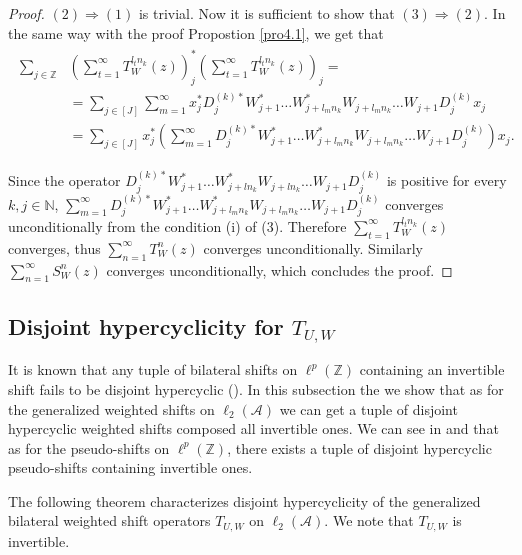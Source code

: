 \documentclass{article}
\begin{document}
\begin{proof}
$(2)\Rightarrow(1)$ is trivial. Now it is sufficient to show that $(3)\Rightarrow(2)$.
 In the same way with the proof Propostion \ref{pro4.1}, we get that
\begin{eqnarray}\begin{split}\nonumber
\sum_{j\in\mathbb{Z}}&\left(\sum^{\infty}_{t=1}T^{l_{t}n_{k}}_{W}(z)\right)^{\ast}_{j}\left(\sum^{\infty}_{t=1}T^{l_{t}n_{k}}_{W}(z)\right)_{j}=\\
&=\sum_{j\in[J]}\sum^{\infty}_{m=1}{x^{\ast}_{j}}{D^{(k){\ast}}_{j}}{W^{\ast}_{j+1}}\ldots {W^{\ast}_{j+l_{m}n_{k}}}W_{j+l_{m}n_{k}}\ldots W_{j+1}D^{(k)}_{j}x_{j}\\
&=\sum_{j\in[J]}{x^{\ast}_{j}}\left(\sum^{\infty}_{m=1}{D^{(k){\ast}}_{j}}{W^{\ast}_{j+1}}\ldots {W^{\ast}_{j+l_{m}n_{k}}}W_{j+l_{m}n_{k}}\ldots W_{j+1}D^{(k)}_{j}\right)x_{j}.
\end{split}\end{eqnarray}

Since the operator ${D^{(k){\ast}}_{j}}{W^{\ast}_{j+1}}\ldots {W^{\ast}_{j+ln_{k}}}W_{j+ln_{k}}\ldots W_{j+1}D^{(k)}_{j}$ is positive for every $k,j\in\mathbb{N}$, $\sum^{\infty}_{m=1}{D^{(k){\ast}}_{j}}{W^{\ast}_{j+1}}\ldots {W^{\ast}_{j+l_{m}n_{k}}}W_{j+l_{m}n_{k}}\ldots W_{j+1}D^{(k)}_{j}$ converges unconditionally from the condition (i) of (3). Therefore $\sum^{\infty}_{t=1}T^{l_{t}n_{k}}_{W}(z)$ converges, thus $\sum^{\infty}_{n=1} T^{n}_{W}(z)$ converges unconditionally. Similarly $\sum^{\infty}_{n=1} S^{n}_{W}(z)$ converges unconditionally, which concludes the proof.
\end{proof}






\subsection{Disjoint hypercyclicity for $T_{U,W}$}

It is known that  any tuple of  bilateral shifts  on $\ell^{p}(\mathbb{Z})$ containing an invertible shift fails to be disjoint hypercyclic  (\cite{BMS14}).  In this subsection
the we show that as for the generalized weighted shifts on $\ell_{2}(\mathcal{A})$ we can get a tuple of disjoint hypercyclic weighted shifts  composed all invertible ones. We can see in \cite{R24} and \cite{BP07} that as for the pseudo-shifts on $\ell^{p}(\mathbb{Z})$, there exists a
tuple of disjoint hypercyclic pseudo-shifts containing invertible ones.

The following theorem characterizes disjoint hypercyclicity of the generalized bilateral weighted shift operators $T_{U,W}$ on $\ell_{2}(\mathcal{A})$. We note that $T_{U,W}$ is invertible.
\end{document}
